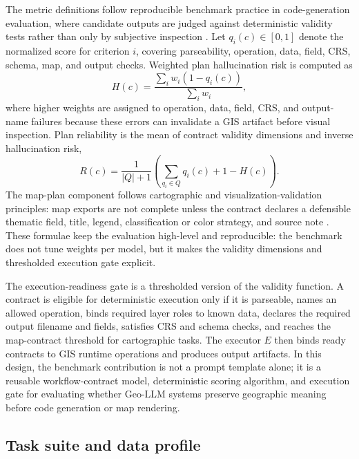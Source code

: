 \documentclass[12pt]{gsis}  %
\begin{document}
The metric definitions follow reproducible benchmark practice in code-generation evaluation, where candidate outputs are judged against deterministic validity tests rather than only by subjective inspection \citep{Li_2022,Ni_2024}. Let \(q_i(c)\in[0,1]\) denote the normalized score for criterion \(i\), covering parseability, operation, data, field, CRS, schema, map, and output checks. Weighted plan hallucination risk is computed as
\begin{equation}
H(c)=\frac{\sum_i w_i(1-q_i(c))}{\sum_i w_i},
\label{eq:h-risk}
\end{equation}
where higher weights are assigned to operation, data, field, CRS, and output-name failures because these errors can invalidate a GIS artifact before visual inspection. Plan reliability is the mean of contract validity dimensions and inverse hallucination risk,
\begin{equation}
R(c)=\frac{1}{|Q|+1}\left(\sum_{q_i\in Q} q_i(c) + 1-H(c)\right).
\label{eq:prs}
\end{equation}
The map-plan component follows cartographic and visualization-validation principles: map exports are not complete unless the contract declares a defensible thematic field, title, legend, classification or color strategy, and source note \citep{Roth_2013,Roth_2015,Munzner_2009,Kang_2024}. These formulae keep the evaluation high-level and reproducible: the benchmark does not tune weights per model, but it makes the validity dimensions and thresholded execution gate explicit.

The execution-readiness gate is a thresholded version of the validity function. A contract is eligible for deterministic execution only if it is parseable, names an allowed operation, binds required layer roles to known data, declares the required output filename and fields, satisfies CRS and schema checks, and reaches the map-contract threshold for cartographic tasks. The executor \(E\) then binds ready contracts to GIS runtime operations and produces output artifacts. In this design, the benchmark contribution is not a prompt template alone; it is a reusable workflow-contract model, deterministic scoring algorithm, and execution gate for evaluating whether Geo-LLM systems preserve geographic meaning before code generation or map rendering.

\subsection{Task suite and data profile}
\end{document}
